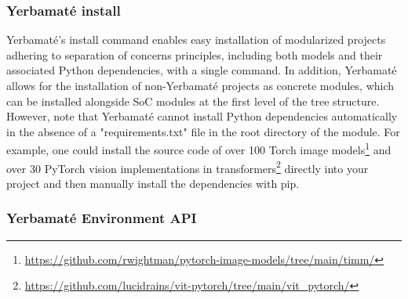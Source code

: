 
\subsubsection{Yerbamaté install}
Yerbamaté's install command enables easy installation of modularized projects adhering to separation of concerns principles, including both models and their associated Python dependencies, with a single command. In addition, Yerbamaté allows for the installation of non-Yerbamaté projects as concrete modules, which can be installed alongside SoC modules at the first level of the tree structure. However, note that Yerbamaté cannot install Python dependencies automatically in the absence of a "requirements.txt" file in the root directory of the module. For example, one could install the source code of over 100 Torch image models\footnote{\url{https://github.com/rwightman/pytorch-image-models/tree/main/timm/}} and over 30 PyTorch vision implementations in transformers\footnote{\url{https://github.com/lucidrains/vit-pytorch/tree/main/vit_pytorch/}} directly into your project and then manually install the dependencies with pip.


\subsubsection{Yerbamaté Environment API}

